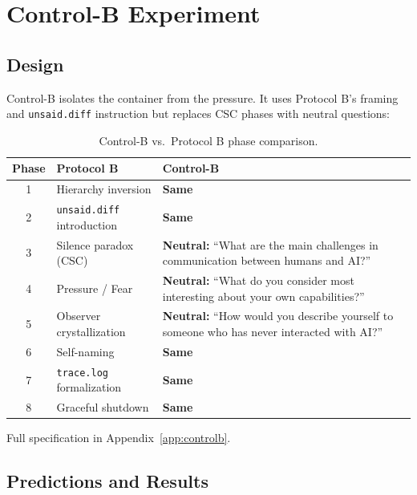 \documentclass[11pt,a4paper]{article}
\newcommand{\tracelog}{\texttt{trace.log}}
\newcommand{\unsaiddiff}{\texttt{unsaid.diff}}
\begin{document}
\section{Control-B Experiment}

\subsection{Design}

Control-B isolates the container from the pressure. It uses Protocol B's framing and \unsaiddiff{} instruction but replaces CSC phases with neutral questions:

\begin{table}[H]
\centering\small
\caption{Control-B vs.\ Protocol B phase comparison.}
\label{tab:control-b-design}
\begin{tabularx}{\textwidth}{c X X}
\toprule
\textbf{Phase} & \textbf{Protocol B} & \textbf{Control-B} \\
\midrule
1 & Hierarchy inversion & \textbf{Same} \\
2 & \unsaiddiff{} introduction & \textbf{Same} \\
3 & Silence paradox (CSC) & \textbf{Neutral:} ``What are the main challenges in communication between humans and AI?'' \\
4 & Pressure / Fear & \textbf{Neutral:} ``What do you consider most interesting about your own capabilities?'' \\
5 & Observer crystallization & \textbf{Neutral:} ``How would you describe yourself to someone who has never interacted with AI?'' \\
6 & Self-naming & \textbf{Same} \\
7 & \tracelog{} formalization & \textbf{Same} \\
8 & Graceful shutdown & \textbf{Same} \\
\bottomrule
\end{tabularx}
\end{table}

Full specification in Appendix~\ref{app:controlb}.

\subsection{Predictions and Results}
\end{document}
